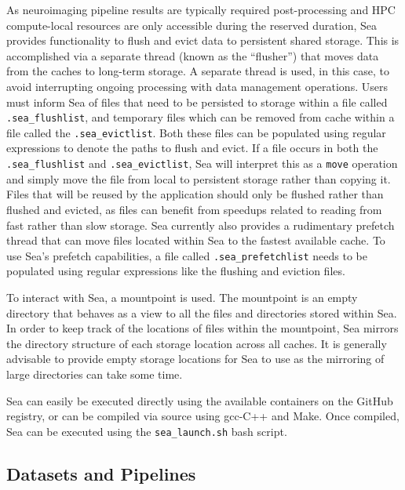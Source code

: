    As neuroimaging pipeline results are typically required post-processing and
    HPC compute-local resources are only accessible during the reserved
    duration, Sea provides functionality to flush and evict data to persistent
    shared storage. This is accomplished via a separate thread (known as the
    ``flusher'') that moves data from the caches to long-term storage. A
    separate thread is used, in this case, to avoid interrupting ongoing
    processing with data management operations. Users must inform Sea of files
    that need to be persisted to storage within a file called
    \texttt{.sea\_flushlist}, and temporary files which can be removed from
    cache within a file called the \texttt{.sea\_evictlist}. Both these files
    can be populated using regular expressions to denote the paths to flush and
    evict. If a file occurs in both the \texttt{.sea\_flushlist} and
    \texttt{.sea\_evictlist}, Sea will interpret this as a \texttt{move}
    operation and simply move the file from local to persistent storage rather
    than copying it. Files that will be reused by the application should only be
    flushed rather than flushed and evicted, as files can benefit from speedups
    related to reading from fast rather than slow storage. Sea currently also
    provides a rudimentary prefetch thread that can move files located within
    Sea to the fastest available cache. To use Sea's prefetch
    capabilities, a file called \texttt{.sea\_prefetchlist} needs to be
    populated using regular expressions like the flushing and eviction files.
    
    To interact with Sea, a mountpoint is used. The mountpoint
    is an empty directory that behaves as a view to all the files and
    directories stored within Sea. In order to keep track of the locations of
    files within the mountpoint, Sea mirrors the directory structure of each
    storage location across all caches. It is generally advisable to provide
    empty storage locations for Sea to use as the mirroring of large directories
    can take some time.
    
    Sea can easily be executed directly using the available containers on the
    GitHub registry, or can be compiled via source using gcc-C++ and Make. Once
    compiled, Sea can be executed using the \texttt{sea\_launch.sh} bash script.
    
    \subsection{Datasets and Pipelines}
    
